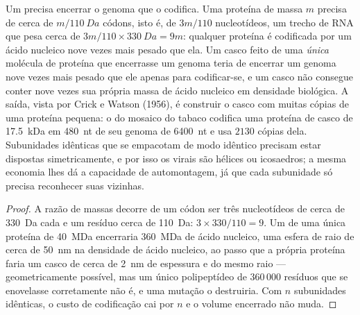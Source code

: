 \begin{proposition}\label{prop:b3:virology:economy}
Um  precisa encerrar o genoma que o codifica. Uma proteína de
massa $m$ precisa de cerca de $m/\qty{110}{Da}$ códons, isto é, de
$3m/110$ nucleotídeos, um trecho de RNA que pesa cerca de
$3m/110\times\qty{330}{Da} = 9m$: qualquer proteína é codificada por um
ácido nucleico nove vezes mais pesado que ela. Um casco feito de uma
\emph{única} molécula de proteína que encerrasse um genoma teria de
encerrar um genoma nove vezes mais pesado que ele apenas para
codificar-se, e um casco não consegue conter nove vezes sua própria
massa de ácido nucleico em densidade biológica. A saída, vista por
Crick e Watson (1956), é construir o casco com muitas cópias de uma
proteína pequena: o  do mosaico do tabaco codifica uma proteína de
casco de \qty{17.5}{kDa} em \qty{480}{nt} de seu genoma de
\qty{6400}{nt} e usa $2130$ cópias dela. Subunidades idênticas que se
empacotam de modo idêntico precisam estar dispostas simetricamente, e
por isso os  virais são hélices ou icosaedros; a mesma
economia lhes dá a capacidade de automontagem, já que cada subunidade
só precisa reconhecer suas vizinhas.
\end{proposition}
\begin{proof}
A razão de massas decorre de um códon ser três nucleotídeos de cerca de
\qty{330}{Da} cada e um resíduo cerca de \qty{110}{Da}:
$3\times 330/110 =
9$. Um  de uma única proteína de
\qty{40}{MDa} encerraria \qty{360}{MDa} de ácido nucleico, uma esfera
de raio de cerca de \qty{50}{nm} na densidade de ácido nucleico, ao
passo que a própria proteína faria um casco de cerca de \qty{2}{nm} de
espessura e do mesmo raio --- geometricamente possível, mas um único
polipeptídeo de $360\,000$ resíduos que se enovelasse corretamente não
é, e uma mutação o destruiria. Com $n$ subunidades idênticas, o custo
de codificação cai por $n$ e o volume encerrado não muda.
\end{proof}

